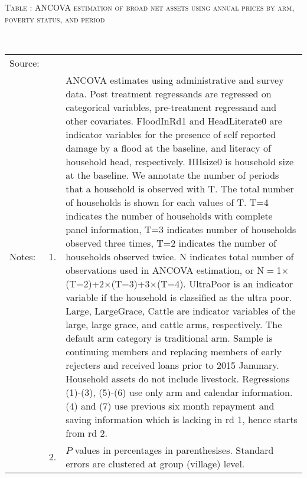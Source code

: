 \hspace{-1cm}\begin{minipage}[t]{14cm}
\hfil\textsc{\normalsize Table \thetable: ANCOVA estimation of broad net assets using annual prices by arm, poverty status, and period\label{tab ANCOVA net assets using annual prices timevarying poverty status}}\\
\setlength{\tabcolsep}{1pt}
\setlength{\baselineskip}{8pt}
\renewcommand{\arraystretch}{.55}
\hfil{}\\
\renewcommand{\arraystretch}{.8}
\setlength{\tabcolsep}{1pt}
\begin{tabular}{>{\hfill\scriptsize}p{1cm}<{}>{\hfill\scriptsize}p{.25cm}<{}>{\scriptsize}p{12cm}<{\hfill}}
Source:& \multicolumn{2}{l}{\scriptsize Estimated with GUK administrative and survey data.}\\
Notes: & 1. & ANCOVA estimates using administrative and survey data. Post treatment regressands are regressed on categorical variables, pre-treatment regressand and other covariates. \textsf{FloodInRd1} and \textsf{HeadLiterate0} are indicator variables for the presence of self reported damage by a flood at the baseline, and literacy of household head, respectively. \textsf{HHsize0} is household size at the baseline. We annotate the number of periods that a household is observed with \textsf{T}. The total number of households is shown for each values of \textsf{T}. \textsf{T=4} indicates the number of households with complete panel information, \textsf{T=3} indicates number of households observed three times, \textsf{T=2} indicates the number of households observed twice. \textsf{N} indicates total number of observations used in ANCOVA estimation, or \textsf{N$=$1$\times$(T=2)+2$\times$(T=3)+3$\times$(T=4)}.  \textsf{UltraPoor} is an indicator variable if the household is classified as the ultra poor. \textsf{Large}, \textsf{LargeGrace}, \textsf{Cattle} are indicator variables of the \textsf{large}, \textsf{large grace}, and \textsf{cattle} arms, respectively. The default arm category is \textsf{traditional} arm. Sample is continuing members and replacing members of early rejecters and received loans prior to 2015 Janunary. Household assets do not include livestock. Regressions (1)-(3), (5)-(6) use only arm and calendar information. (4) and (7) use previous six month repayment and saving information which is lacking in rd 1, hence starts from rd 2.\\
& 2. & $P$ values in percentages in parenthesises. Standard errors are clustered at group (village) level.
\end{tabular}
\end{minipage}

